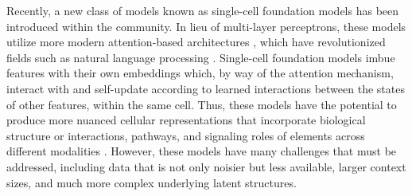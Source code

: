 Recently, a new class of models known as single-cell foundation models has been introduced within the community.
In lieu of multi-layer perceptrons, these models \cite{theodoris2023, cui2024, rosen2023} utilize more modern attention-based architectures \cite{vaswani2023}, which have revolutionized fields such as natural language processing \cite{devlin2019, openai2024}.
Single-cell foundation models imbue features with their own embeddings which, by way of the attention mechanism, interact with and self-update according to learned interactions between the states of other features, within the same cell.
Thus, these models have the potential to produce more nuanced cellular representations that incorporate biological structure \cite{stark2021,roohani2023}
or interactions, pathways, and signaling roles of elements across different modalities \cite{argelaguet2018, immer2024,}.
However, these models have many challenges \cite{ma2024, kedzierska2023, crowell2023} that must be addressed, including data that is not only noisier but less available, larger context sizes, and much more complex underlying latent structures.

  

